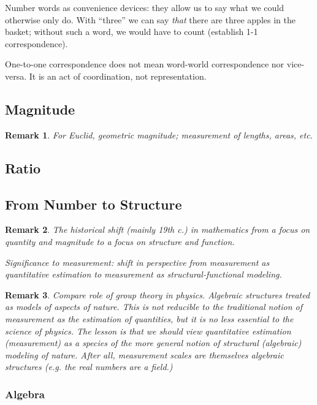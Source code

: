 \documentclass[11pt,twoside]{article}
\newtheorem{remark}{Remark}
\begin{document}
Number words as convenience devices: they allow us to say what we
could otherwise only do.  With ``three'' we can say \textit{that}
there are three apples in the basket; without such a word, we would
have to count (establish 1-1 correspondence).

One-to-one correspondence does not mean word-world correspondence nor
vice-versa.  It is an act of coordination, not representation.

\subsection{Magnitude}

\begin{remark}
  For Euclid, geometric magnitude; measurement of lengths, areas, etc.
\end{remark}

\subsection{Ratio}

\subsection{From Number to Structure}

\begin{remark}
The historical shift (mainly 19th c.) in mathematics from a focus on
quantity and magnitude to a focus on structure and function.

Significance to measurement: shift in perspective from measurement as
quantitative estimation to measurement as structural-functional modeling.
\end{remark}

\begin{remark}
  Compare role of group theory in physics.  Algebraic structures
  treated as models of aspects of nature.  This is not reducible to
  the traditional notion of measurement as the estimation of
  quantities, but it is no less essential to the science of physics.
  The lesson is that we should view quantitative estimation
  (measurement) as a species of the more general notion of structural
  (algebraic) modeling of nature.  After all, measurement scales are
  themselves algebraic structures (e.g. the real numbers are a field.)
\end{remark}

\subsubsection{Algebra}
\end{document}
